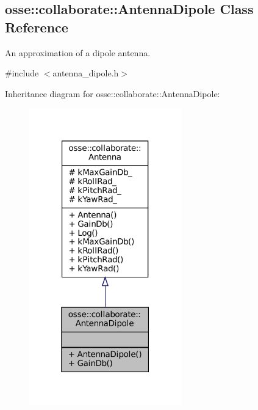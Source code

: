 \hypertarget{classosse_1_1collaborate_1_1_antenna_dipole}{}\subsection{osse\+:\+:collaborate\+:\+:Antenna\+Dipole Class Reference}
\label{classosse_1_1collaborate_1_1_antenna_dipole}


An approximation of a dipole antenna.  




{\ttfamily \#include $<$antenna\+\_\+dipole.\+h$>$}



Inheritance diagram for osse\+:\+:collaborate\+:\+:Antenna\+Dipole\+:
\nopagebreak
\begin{figure}[H]
\begin{center}
\leavevmode
\includegraphics[width=187pt]{classosse_1_1collaborate_1_1_antenna_dipole__inherit__graph}
\end{center}
\end{figure}
